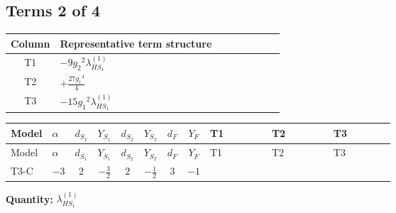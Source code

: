 \documentclass[8pt]{article}
\begin{document}
\begin{landscape}
\subsection*{Terms 2 of 4}
\begin{center}
\begin{tabular}{@{}c >{\raggedright\arraybackslash}p{0.82\linewidth}@{}}
\toprule
Column & Representative term structure \\
\midrule
T1 & \(\displaystyle -9 {g_2}^2 {\lambda_{HS_1}^{(1)}}\) \\
\midrule
T2 & \(\displaystyle +\frac{27 {g_1}^4}{4}\) \\
\midrule
T3 & \(\displaystyle -15 {g_1}^2 {\lambda_{HS_1}^{(1)}}\) \\
\midrule
\bottomrule
\end{tabular}
\end{center}
\smallskip
\tiny
\begin{longtable}{@{}llcccccc >{\raggedright\arraybackslash}p{0.21\linewidth} >{\raggedright\arraybackslash}p{0.21\linewidth} >{\raggedright\arraybackslash}p{0.21\linewidth}@{}}
\toprule
Model & $\alpha$ & $d_{S_1}$ & $Y_{S_1}$ & $d_{S_2}$ & $Y_{S_2}$ & $d_F$ & $Y_F$ & T1 & T2 & T3 \\
\midrule
\endfirsthead
\toprule
Model & $\alpha$ & $d_{S_1}$ & $Y_{S_1}$ & $d_{S_2}$ & $Y_{S_2}$ & $d_F$ & $Y_F$ & T1 & T2 & T3 \\
\midrule
\endhead
T3-C & $-3$ & $2$ & $-\frac{3}{2}$ & $2$ & $-\frac{1}{2}$ & $3$ & $-1$ & \scriptsize\adjustbox{max width=\linewidth}{$\begin{gathered} -9 {g_2}^2 {\lambda_{HS_1}^{(1)}}\end{gathered}$} & \scriptsize\adjustbox{max width=\linewidth}{$\begin{gathered} +\frac{27 {g_1}^4}{4}\end{gathered}$} & \scriptsize\adjustbox{max width=\linewidth}{$\begin{gathered} -15 {g_1}^2 {\lambda_{HS_1}^{(1)}}\end{gathered}$} \\
\midrule
\bottomrule
\end{longtable}
\clearpage
\noindent\textbf{Quantity: }$\lambda_{HS_1}^{(1)}$\par\smallskip

\end{landscape}
\end{document}
